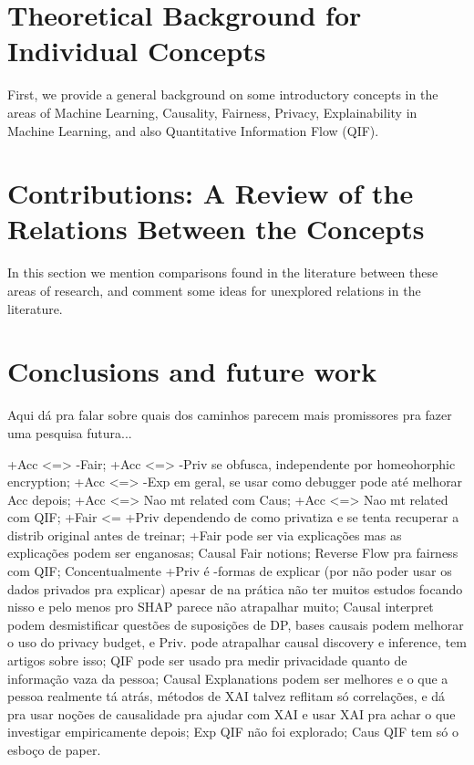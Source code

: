 \documentclass{article}
\begin{document}
\section{Theoretical Background for Individual Concepts}\label{sec:theoRef1}

First, we provide a general background on some introductory concepts in the areas of Machine Learning, Causality, Fairness, Privacy, Explainability in Machine Learning, and also Quantitative Information Flow (QIF).



\section{Contributions: A Review of the Relations Between the Concepts}\label{sec:theoRef2}

In this section we mention comparisons found in the literature between these areas of research, and comment some ideas for unexplored relations in the literature.



\section{Conclusions and future work}\label{sec:concsFuture}

{\color{red} Aqui dá pra falar sobre quais dos caminhos parecem mais promissores pra fazer uma pesquisa futura...}

{\color{red} +Acc <=> -Fair; +Acc <=> -Priv se obfusca, independente por homeohorphic encryption; +Acc <=> -Exp em geral, se usar como debugger pode até melhorar Acc depois; +Acc <=> Nao mt related com Caus; +Acc <=> Nao mt related com QIF; +Fair <= +Priv dependendo de como privatiza e se tenta recuperar a distrib original antes de treinar; +Fair pode ser via explicações mas as explicações podem ser enganosas; Causal Fair notions; Reverse Flow pra fairness com QIF; Concentualmente +Priv é -formas de explicar (por não poder usar os dados privados pra explicar) apesar de na prática não ter muitos estudos focando nisso e pelo menos pro SHAP parece não atrapalhar muito; Causal interpret podem desmistificar questões de suposições de DP, bases causais podem melhorar o uso do privacy budget, e Priv. pode atrapalhar causal discovery e inference, tem artigos sobre isso; QIF pode ser usado pra medir privacidade quanto de informação vaza da pessoa; Causal Explanations podem ser melhores e o que a pessoa realmente tá atrás, métodos de XAI talvez reflitam só correlações, e dá pra usar noções de causalidade pra ajudar com XAI e usar XAI pra achar o que investigar empiricamente depois; Exp QIF não foi explorado; Caus QIF tem só o esboço de paper.}
\end{document}

